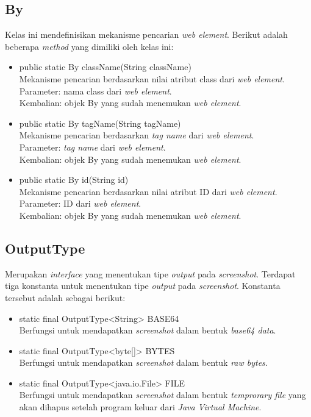 \subsection{By}
\label{subsec:by}
Kelas ini mendefinisikan mekanisme pencarian \textit{web element}. Berikut adalah beberapa \textit{method} yang dimiliki oleh kelas ini:
\begin{itemize}
\item public static By className(String className)\\
Mekanisme pencarian berdasarkan nilai atribut class dari \textit{web element}.\\
Parameter: nama class dari \textit{web element}.\\
Kembalian: objek By yang sudah menemukan \textit{web element}.
\item public static By tagName(String tagName)\\
Mekanisme pencarian berdasarkan \textit{tag name} dari \textit{web element}.\\
Parameter: \textit{tag name}  dari \textit{web element}.\\
Kembalian: objek By yang sudah menemukan \textit{web element}.
\item public static By id(String id) \\
Mekanisme pencarian berdasarkan nilai atribut ID dari \textit{web element}.\\
Parameter: ID dari \textit{web element}.\\
Kembalian: objek By yang sudah menemukan \textit{web element}.
\end{itemize} 

\subsection{OutputType}
\label{subsec:output_type}
Merupakan \textit{interface} yang menentukan tipe \textit{output} pada \textit{screenshot}. Terdapat tiga konstanta untuk menentukan tipe \textit{output} pada \textit{screenshot}. Konstanta tersebut adalah sebagai berikut:
\begin{itemize}
\item static final OutputType<String> BASE64\\
Berfungsi untuk mendapatkan \textit{screenshot} dalam bentuk \textit{base64 data}.
\item static final OutputType<byte[]> BYTES\\
Berfungsi untuk mendapatkan \textit{screenshot} dalam bentuk \textit{raw bytes}.
\item static final OutputType<java.io.File> FILE\\
Berfungsi untuk mendapatkan \textit{screenshot} dalam bentuk \textit{temprorary file} yang akan dihapus setelah program keluar dari \textit{Java Virtual Machine}.
\end{itemize}


